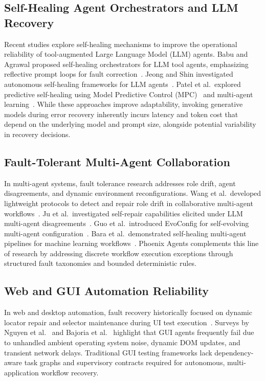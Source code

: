 \documentclass[conference]{IEEEtran}
\begin{document}
\subsection{Self-Healing Agent Orchestrators and LLM Recovery}
Recent studies explore self-healing mechanisms to improve the operational reliability of tool-augmented Large Language Model (LLM) agents. Babu and Agrawal proposed self-healing orchestrators for LLM tool agents, emphasizing reflective prompt loops for fault correction~\cite{babu2026}. Jeong and Shin investigated autonomous self-healing frameworks for LLM agents~\cite{jeong2026}. Patel et al.\ explored predictive self-healing using Model Predictive Control (MPC)~\cite{patel2026a} and multi-agent learning~\cite{patel2026b}. While these approaches improve adaptability, invoking generative models during error recovery inherently incurs latency and token cost that depend on the underlying model and prompt size, alongside potential variability in recovery decisions.

\subsection{Fault-Tolerant Multi-Agent Collaboration}
In multi-agent systems, fault tolerance research addresses role drift, agent disagreements, and dynamic environment reconfigurations. Wang et al.\ developed lightweight protocols to detect and repair role drift in collaborative multi-agent workflows~\cite{wang2026}. Ju et al.\ investigated self-repair capabilities elicited under LLM multi-agent disagreements~\cite{ju2025}. Guo et al.\ introduced EvoConfig for self-evolving multi-agent configuration~\cite{guo2026}. Bara et al.\ demonstrated self-healing multi-agent pipelines for machine learning workflows~\cite{bara2026}. Phoenix Agents complements this line of research by addressing discrete workflow execution exceptions through structured fault taxonomies and bounded deterministic rules.

\subsection{Web and GUI Automation Reliability}
In web and desktop automation, fault recovery historically focused on dynamic locator repair and selector maintenance during UI test execution~\cite{garcia2026}. Surveys by Nguyen et al.~\cite{nguyen2025} and Bajoria et al.~\cite{bajoria2026} highlight that GUI agents frequently fail due to unhandled ambient operating system noise, dynamic DOM updates, and transient network delays. Traditional GUI testing frameworks lack dependency-aware task graphs and supervisory contracts required for autonomous, multi-application workflow recovery.
\end{document}
